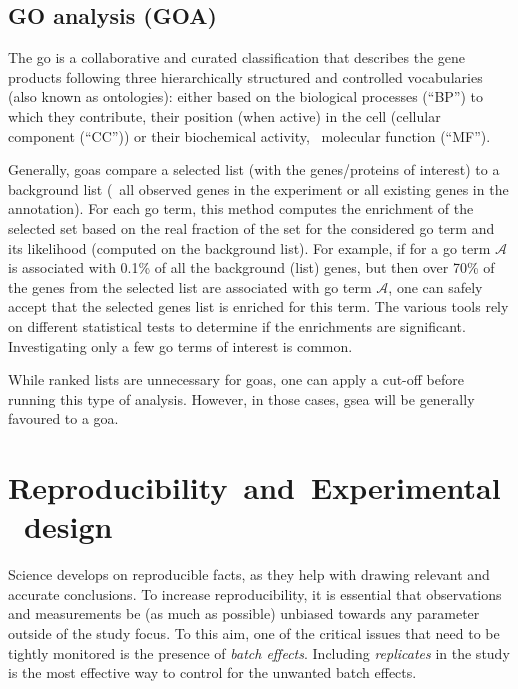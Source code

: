 \subsection{GO analysis (GOA)}\label{sec:goaGeneralities}
The \gls{go} is a collaborative and curated classification
that describes the gene products
following three hierarchically structured and controlled vocabularies
(also known as ontologies):
either based on the biological processes (\enquote{BP}) to which they contribute,
their position (when active) in the cell (cellular component (\enquote{CC})) or
their biochemical activity, \ie\ molecular function (\enquote{MF}).~\mybr\

Generally, \glspl{goa} compare a selected list (with the genes/proteins of interest)
to a background list
(\eg\ all observed genes in the experiment or all existing genes in the annotation).
For each \gls{go} term,
this method computes the enrichment of the selected set based on
the real fraction of the set for the considered \gls{go} term and its likelihood
(computed on the background list).
For example, if for a \gls{go} term $\mathcal{A}$ is associated with 0.1\%
of all the background (list) genes,
but then over 70\% of the genes from the selected list are associated
with \gls{go} term $\mathcal{A}$,
one can safely accept that the selected genes list is enriched for this term.
The various tools rely on different statistical tests to determine
if the enrichments are significant.
Investigating only a few \gls{go} terms of interest is common.\mybr\

While ranked lists are unnecessary for \glspl{goa},
one can apply a cut-off before running this type of analysis.
However, in those cases,
\gls{gsea} will be generally favoured to a \gls{goa}.\mybr\

\section{Reproducibility~and~Experimental~design}\label{sec:expDesign}

Science develops on reproducible facts,
as they help with drawing relevant and accurate conclusions.
To increase reproducibility,
it is essential that observations and measurements
be (as much as possible) unbiased
towards any parameter outside of the study focus.
To this aim, one of the critical issues that need to be tightly monitored
is the presence of \emph{batch effects}.
Including \emph{replicates} in the study is the most effective way to control
for the unwanted batch effects.\mybr\

